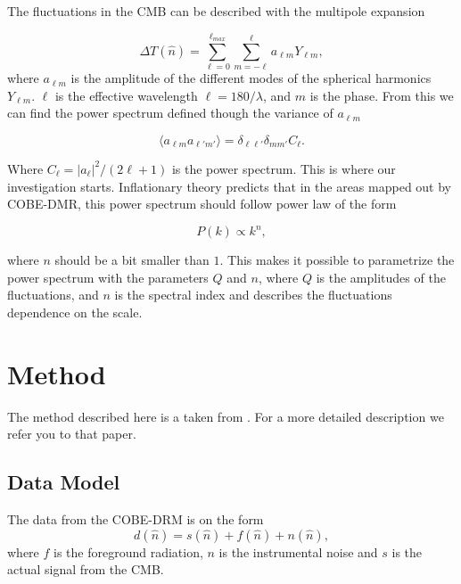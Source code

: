 \documentclass{emulateapj}
\begin{document}
The fluctuations in the CMB can be described with the multipole expansion

\begin{equation}
\Delta T(\hat{n}) = \sum_{\ell = 0}^{\ell_{max}}\sum_{m = -\ell}^\ell a_{\ell m}Y_{\ell m},
\end{equation}
where $a_{\ell m}$ is the amplitude of the different modes of the spherical harmonics $Y_{\ell m}$. $\ell$ is the effective wavelength $\ell = 180/\lambda$, and $m$ is the phase. From this we can find the power spectrum defined though the variance of $a_{\ell m}$

\begin{equation}
\langle a_{\ell m}a_{\ell'm'}\rangle = \delta_{\ell \ell '}\delta_{m m'}C_\ell.
\end{equation}

Where $C_\ell = |a_\ell|^2/(2\ell + 1)$ is the power spectrum. This is where our investigation starts. Inflationary theory predicts that in the areas mapped out by COBE-DMR, this power spectrum should follow power law of the form

\begin{equation}
P(k) \propto k^n,
\end{equation}

where $n$ should be a bit smaller than $1$. This makes it possible to parametrize the power spectrum with the parameters $Q$ and $n$, where $Q$ is the amplitudes of the fluctuations, and $n$ is the spectral index and describes the fluctuations dependence on the scale.




\section{Method}
The method described here is a taken from \cite{oppgave}. For a more detailed description we refer you to that paper.
\label{sec:method}

\subsection{Data Model}
The data from the COBE-DRM is on the form
\begin{equation}
d(\hat{n}) = s(\hat{n}) + f(\hat{n}) + n(\hat{n}),
\end{equation}
where $f$ is the foreground radiation, $n$ is the instrumental noise and $s$ is the actual signal from the CMB.
\end{document}
